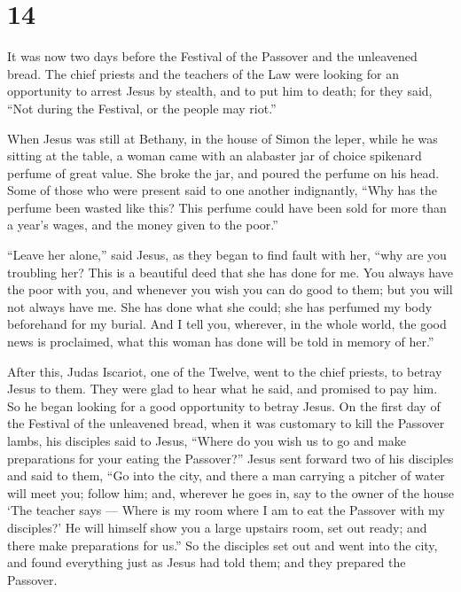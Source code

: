 \hypertarget{section-13}{%
\section{14}\label{section-13}}

 It was now two days before the Festival of the Passover and
the unleavened bread. The chief priests and the teachers of the Law were
looking for an opportunity to arrest Jesus by stealth, and to put him to
death;  for they said, ``Not during the Festival, or the
people may riot.''

 When Jesus was still at Bethany, in the house of Simon the
leper, while he was sitting at the table, a woman came with an alabaster
jar of choice spikenard perfume of great value. She broke the jar, and
poured the perfume on his head.  Some of those who were
present said to one another indignantly, ``Why has the perfume been
wasted like this?  This perfume could have been sold for
more than a year's wages, and the money given to the poor.''

 ``Leave her alone,'' said Jesus, as they began to find
fault with her, ``why are you troubling her? This is a beautiful deed
that she has done for me.  You always have the poor with
you, and whenever you wish you can do good to them; but you will not
always have me.  She has done what she could; she has
perfumed my body beforehand for my burial.  And I tell you,
wherever, in the whole world, the good news is proclaimed, what this
woman has done will be told in memory of her.''

 After this, Judas Iscariot, one of the Twelve, went to the
chief priests, to betray Jesus to them.  They were glad to
hear what he said, and promised to pay him. So he began looking for a
good opportunity to betray Jesus.  On the first day of the
Festival of the unleavened bread, when it was customary to kill the
Passover lambs, his disciples said to Jesus, ``Where do you wish us to
go and make preparations for your eating the Passover?'' 
Jesus sent forward two of his disciples and said to them, ``Go into the
city, and there a man carrying a pitcher of water will meet you; follow
him;  and, wherever he goes in, say to the owner of the
house `The teacher says --- Where is my room where I am to eat the
Passover with my disciples?'  He will himself show you a
large upstairs room, set out ready; and there make preparations for
us.''  So the disciples set out and went into the city, and
found everything just as Jesus had told them; and they prepared the
Passover.

